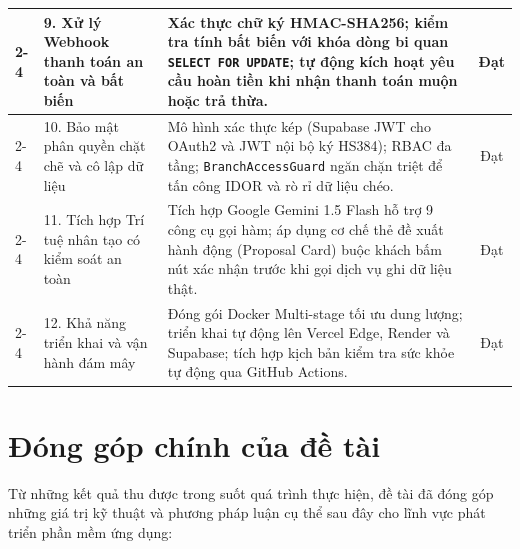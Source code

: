 \begin{table}[H]
\begin{tabular}{|p{1.4cm}|p{4.2cm}|p{6.4cm}|c|}
\cline{2-4}
 & 9. Xử lý Webhook thanh toán an toàn và bất biến & Xác thực chữ ký HMAC-SHA256; kiểm tra tính bất biến với khóa dòng bi quan \texttt{SELECT FOR UPDATE}; tự động kích hoạt yêu cầu hoàn tiền khi nhận thanh toán muộn hoặc trả thừa. & Đạt \\
\cline{2-4}
 & 10. Bảo mật phân quyền chặt chẽ và cô lập dữ liệu & Mô hình xác thực kép (Supabase JWT cho OAuth2 và JWT nội bộ ký HS384); RBAC đa tầng; \texttt{BranchAccessGuard} ngăn chặn triệt để tấn công IDOR và rò rỉ dữ liệu chéo. & Đạt \\
\cline{2-4}
 & 11. Tích hợp Trí tuệ nhân tạo có kiểm soát an toàn & Tích hợp Google Gemini 1.5 Flash hỗ trợ 9 công cụ gọi hàm; áp dụng cơ chế thẻ đề xuất hành động (Proposal Card) buộc khách bấm nút xác nhận trước khi gọi dịch vụ ghi dữ liệu thật. & Đạt \\
\cline{2-4}
 & 12. Khả năng triển khai và vận hành đám mây & Đóng gói Docker Multi-stage tối ưu dung lượng; triển khai tự động lên Vercel Edge, Render và Supabase; tích hợp kịch bản kiểm tra sức khỏe tự động qua GitHub Actions. & Đạt \\
\hline
\end{tabular}
\end{table}

\section{Đóng góp chính của đề tài}
\label{sec:kl_donggop}

Từ những kết quả thu được trong suốt quá trình thực hiện, đề tài đã đóng góp những giá trị kỹ thuật và phương pháp luận cụ thể sau đây cho lĩnh vực phát triển phần mềm ứng dụng:

